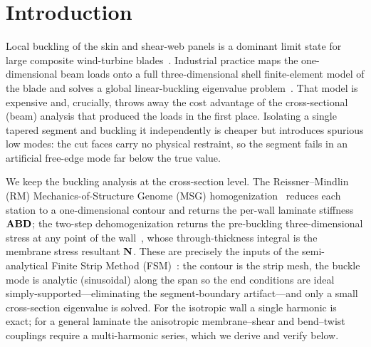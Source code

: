 \section{Introduction}\label{sec:intro}
Local buckling of the skin and shear-web panels is a dominant limit state for large composite
wind-turbine blades~\citep{berg2011,cmc2011}. Industrial practice maps the one-dimensional beam loads onto
a full three-dimensional shell finite-element model of the blade and solves a global linear-buckling
eigenvalue problem~\citep{berg2011}. That model is expensive and, crucially, throws away the cost advantage
of the cross-sectional (beam) analysis that produced the loads in the first place. Isolating a single
tapered segment and buckling it independently is cheaper but introduces spurious low modes: the cut faces
carry no physical restraint, so the segment fails in an artificial free-edge mode far below the true value.

We keep the buckling analysis at the cross-section level. The Reissner--Mindlin (RM) Mechanics-of-Structure
Genome (MSG) homogenization~\citep{yu2016msg,deoyu2020} reduces each station to a one-dimensional contour and
returns the per-wall laminate stiffness $\mathbf{ABD}$; the two-step dehomogenization returns the pre-buckling
three-dimensional stress at any point of the wall~\citep{bagla2025}, whose through-thickness integral is the
membrane stress resultant $\mathbf{N}$. These are precisely the inputs of the semi-analytical Finite Strip Method
(FSM)~\citep{cheung1976,schafer2006}: the contour is the strip mesh, the buckle mode is analytic
(sinusoidal) along the span so the end conditions are ideal simply-supported---eliminating the
segment-boundary artifact---and only a small cross-section eigenvalue is solved. For the isotropic wall a
single harmonic is exact; for a general laminate the anisotropic membrane--shear and bend--twist couplings
require a multi-harmonic series, which we derive and verify below.

